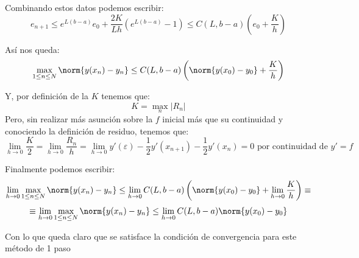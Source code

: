\begin{problem}[2]
Combinando estos datos podemos escribir:
\[e_{n+1} \leq e^{L(b-a)}e_0+\frac{2K}{Lh}\left( e^{L(b-a)}-1\right) \leq C(L,b-a)\left( e_0 +\frac{K}{h}\right)\]

Así nos queda:
\[\max_{1\leq n \leq N} \norm{y(x_n)-y_n} \leq C(L,b-a)\left( \norm{y(x_0)-y_0} +\frac{K}{h}\right)\]

Y, por definición de la $K$ tenemos que:
\[K = \max_n |R_n|\]
Pero, sin realizar más asunción sobre la $f$ inicial más que su continuidad y conociendo la definición de residuo, tenemos que:
\[\lim_{h\to 0} \frac{K}{2} = \lim_{h \to 0} \frac{R_n}{h} = \lim_{h \to 0} y'(ε)-\frac{1}{2}y'(x_{n+1})-\frac{1}{2}y'(x_n) = 0 \text{ por continuidad de } y'=f\]

Finalmente podemos escribir:
\[\lim_{h\to 0}\max_{1\leq n \leq N} \norm{y(x_n)-y_n} \leq \lim_{h \to 0}C(L,b-a)\left( \norm{y(x_0)-y_0} +\lim_{h \to 0}\frac{K}{h}\right) \equiv\]
\[\equiv \lim_{h\to 0}\max_{1\leq n \leq N} \norm{y(x_n)-y_n} \leq \lim_{h \to 0}C(L,b-a) \norm{y(x_0)-y_0} \]

Con lo que queda claro que se satisface la condición de convergencia para este método de 1 paso
\end{problem}

